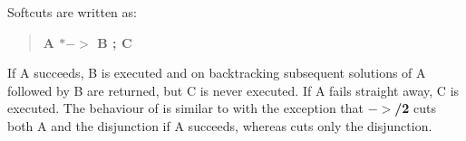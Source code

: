 Softcuts are written as:
\begin{quote}
{\bf A $*->$ B ; C}
\end{quote}
If A succeeds, B is executed and on backtracking subsequent
solutions of A followed by B are returned, but C is never executed.
If A fails straight away, C is executed.
The behaviour of 
is similar to 
with the exception that {\bf $->$/2}
cuts both A and the disjunction if A succeeds, whereas
cuts only the disjunction.

